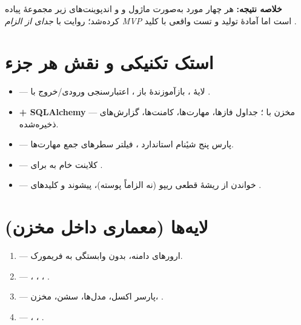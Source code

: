 \documentclass[12pt,a4paper]{article}
\begin{document}
\begin{mybox}
\textbf{خلاصه نتیجه:} هر چهار مورد به‌صورت ماژول  و  و اندپوینت‌های زیر مجموعهٔ  پیاده کرده‌شد؛ روایت با  \emph{جدای از الزام MVP} است اما آمادهٔ تولید و تست واقعی با کلید .
\end{mybox}

\section{استک تکنیکی و نقش هر جزء}
\begin{itemize}
  \item \textbf{} — لایهٔ ، بازآموزندهٔ باز ، اعتبارسنجی ورودی/خروج با .
  \item \textbf{ + SQLAlchemy} — مخزن  با ؛ جداول فازها، مهارت‌ها، کامنت‌ها، گزارش‌های ذخیره‌شده.
  \item \textbf{} — پارس پنج شیٔنام استاندارد ، فیلتر سطرهای جمع مهارت‌ها.
  \item \textbf{} — کلاینت  خام به  برای .
  \item \textbf{} — خواندن  از ریشهٔ قطعی ریپو (نه الزاماً  پوسته)، پیشوند  و کلیدهای .
\end{itemize}

\section{لایه‌ها (معماری داخل مخزن)}
\begin{enumerate}
  \item \textbf{} — ارورهای دامنه، بدون وابستگی به فریمورک.
  \item \textbf{} — ، ، ، .
  \item \textbf{} — پارسر اکسل، مدل‌ها، سشن، مخزن، .
  \item \textbf{} — ، ، .
\end{enumerate}
\end{document}
